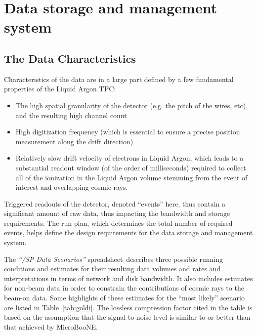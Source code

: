 \section{Data storage and management system}

\subsection{The \pd Data Characteristics}
Characteristics of the \pd data are in a large part defined by a few fundamental
properties of the \pd Liquid Argon TPC:
\begin{itemize}
\item The high spatial granularity of the detector (e.g. the pitch of the wires, etc), and the resulting high channel count
\item High digitization frequency (which is essential to ensure a precise position measurement along the drift direction)
\item Relatively slow drift velocity of electrons in Liquid Argon, which  leads to a substantial readout window (of the order of milliseconds) required to collect
all of the ionization in the Liquid Argon volume stemming from the event of interest and overlapping cosmic rays.
\end{itemize}

Triggered readouts of the detector, denoted ``events'' here, 
thus contain a significant amount of raw data, thus impacting the bandwidth and
storage requirements.   The run plan, which determines the total number of required events, 
helps define the design requirements for the data storage and management system.

The \textit{``\pd/SP Data Scenarios''} spreadsheet\,\cite{data_spreadsheet}  %
describes three possible running conditions and estimates for their
resulting data volumes and rates and interpretations in terms of
network and disk bandwidth. 
 It also includes estimates for non-beam
data in order to constrain the contributions of cosmic rays to the beam-on data.  Some highlights
of these estimates for the ``most likely'' scenario
are listed in Table~\ref{tab:goldi}. The lossless compression factor cited
in the table is based on the assumption that the signal-to-noise level 
is similar to or better than that achieved by MicroBooNE.


